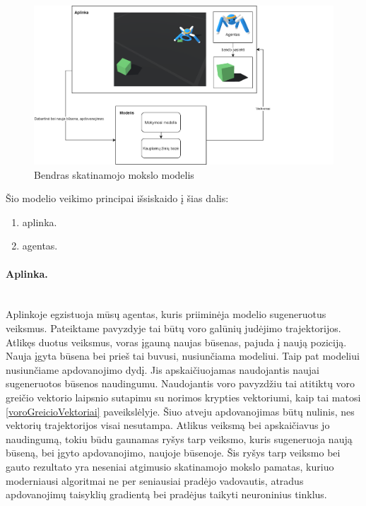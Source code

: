 \documentclass[a4paper, 12pt]{article}
\begin{document}
\begin{figure}[h]
\centering
\includegraphics[width=1.3\textwidth]{RLmodel}
\caption{Bendras skatinamojo mokslo modelis}
\label{RLmodel}
\end{figure}



Šio modelio veikimo principai išsiskaido į šias dalis:
\begin{enumerate}
  \addtolength{\itemsep}{-0.5\baselineskip} 
  \item aplinka. 
  \item agentas. 
\end{enumerate}

\paragraph {Aplinka.}\mbox{}\\
Aplinkoje egzistuoja mūsų agentas, kuris priiminėja modelio sugeneruotus veiksmus. Pateiktame pavyzdyje tai būtų voro galūnių judėjimo trajektorijos. Atlikęs duotus veiksmus, voras įgauną naujas būsenas, pajuda į naują poziciją. Nauja įgyta būsena bei prieš tai buvusi, nusiunčiama modeliui. Taip pat modeliui nusiunčiame apdovanojimo dydį. Jis apskaičiuojamas naudojantis naujai sugeneruotos būsenos naudingumu. Naudojantis voro pavyzdžiu tai atitiktų voro greičio vektorio laipsnio sutapimu su norimos krypties vektoriumi, kaip tai matosi \ref{voroGreicioVektoriai} paveikslėlyje. Šiuo atveju apdovanojimas būtų nulinis, nes vektorių trajektorijos visai nesutampa. Atlikus veiksmą bei apskaičiavus jo naudingumą, tokiu būdu gaunamas ryšys tarp veiksmo, kuris sugeneruoja naują būseną, bei įgyto apdovanojimo, naujoje būsenoje. Šis ryšys tarp veiksmo bei gauto rezultato yra neseniai atgimusio skatinamojo mokslo pamatas, kuriuo moderniausi algoritmai ne per seniausiai pradėjo vadovautis, atradus apdovanojimų taisyklių gradientą bei pradėjus taikyti neuroninius tinklus. 
\end{document}
